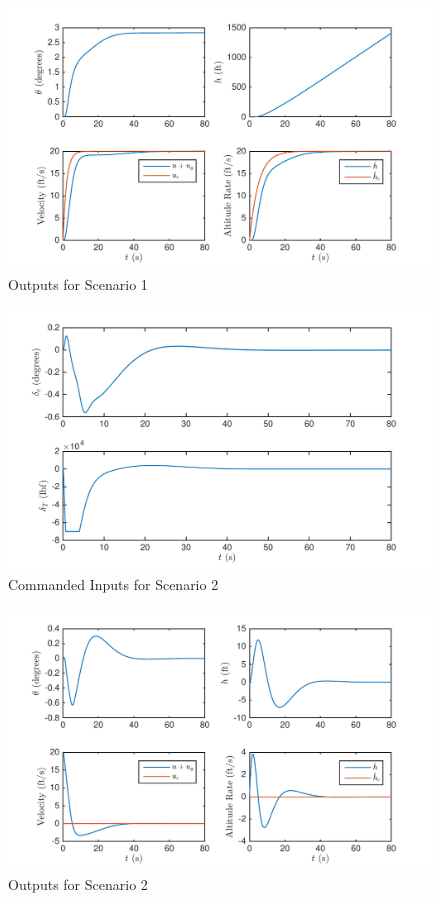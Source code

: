 \documentclass[11pt]{article}
\begin{document}
\begin{figure}[h!]
\begin{center}
\includegraphics[height=.35\textheight]{figures/outputs2}
\caption{Outputs for Scenario 1}
\end{center}
\end{figure}

\begin{figure}[h!]
\begin{center}
\includegraphics[height=.4\textheight]{figures/inputs3}
\caption{Commanded Inputs for Scenario 2}
\end{center}
\end{figure}

\begin{figure}[h!]
\begin{center}
\includegraphics[height=.4\textheight]{figures/outputs4}
\caption{Outputs for Scenario 2}
\end{center}
\end{figure}
\end{document}
